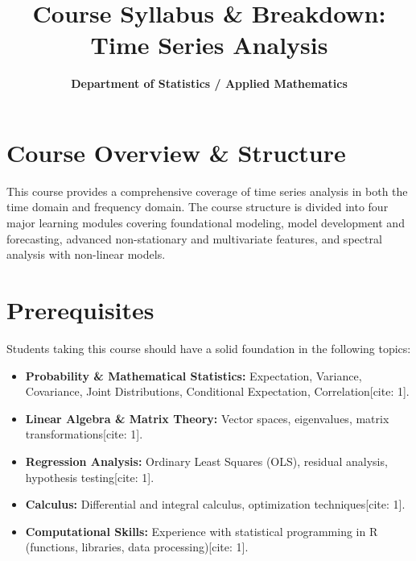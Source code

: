 \documentclass{article}
\title{\textbf{Course Syllabus \& Breakdown: Time Series Analysis}}
\author{\textbf{Department of Statistics / Applied Mathematics}}
\date{}
\begin{document}
\maketitle

\section{Course Overview \& Structure}
This course provides a comprehensive coverage of time series analysis in both the time domain and frequency domain. The course structure is divided into four major learning modules covering foundational modeling, model development and forecasting, advanced non-stationary and multivariate features, and spectral analysis with non-linear models.

\section{Prerequisites}
Students taking this course should have a solid foundation in the following topics:
\begin{itemize}
    \item \textbf{Probability \& Mathematical Statistics:} Expectation, Variance, Covariance, Joint Distributions, Conditional Expectation, Correlation[cite: 1].
    \item \textbf{Linear Algebra \& Matrix Theory:} Vector spaces, eigenvalues, matrix transformations[cite: 1].
    \item \textbf{Regression Analysis:} Ordinary Least Squares (OLS), residual analysis, hypothesis testing[cite: 1].
    \item \textbf{Calculus:} Differential and integral calculus, optimization techniques[cite: 1].
    \item \textbf{Computational Skills:} Experience with statistical programming in R (functions, libraries, data processing)[cite: 1].
\end{itemize}
\end{document}
